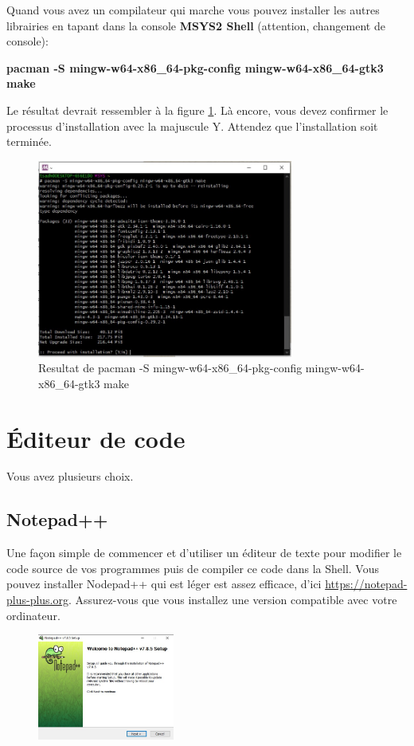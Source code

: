 \documentclass{article}
\begin{document}
Quand vous avez un compilateur qui marche vous pouvez installer les autres librairies en tapant dans la console {\color{Purple}\textbf{MSYS2 Shell}} (attention, changement de console):
\begin{tcolorbox}[width=\textwidth,colframe=Purple,colback={black},title={Ceci est la console MSYS2 Shell},outer arc=0mm,colupper=white]    
      \large\textbf{pacman -S mingw-w64-x86\_64-pkg-config mingw-w64-x86\_64-gtk3 make}
\end{tcolorbox}
Le résultat devrait ressembler à la figure \ref{F:gtkInstal}. Là encore, vous devez confirmer le processus d'installation avec la majuscule Y. Attendez que l'installation soit terminée.
\begin{figure}[H]
\center
\includegraphics[width=0.75\textwidth]{Plots/Msys2_14pkg.jpg}
\caption{Resultat de pacman -S mingw-w64-x86\_64-pkg-config mingw-w64-x86\_64-gtk3 make\label{F:gtkInstal}}
\end{figure}

\section{Éditeur de code\label{S:Editor}}
Vous avez plusieurs choix.
\subsection{Notepad++}
Une façon simple de commencer et d’utiliser un éditeur de texte pour modifier le code source de vos programmes puis de compiler ce code dans la Shell. Vous pouvez installer Nodepad++ qui est léger est assez efficace, d'ici \href{https://notepad-plus-plus.org}{https://notepad-plus-plus.org}. Assurez-vous que vous installez une version compatible avec votre ordinateur.
\begin{figure}[H]
\center
\includegraphics[width=0.4\textwidth]{Plots/Editor_1.jpg}
\end{figure}
\end{document}
